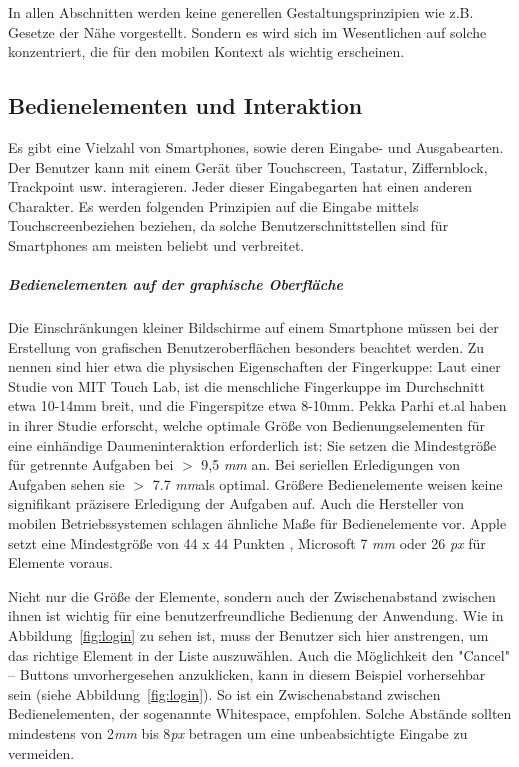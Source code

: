 In allen Abschnitten werden keine generellen Gestaltungsprinzipien wie z.B. Gesetze der Nähe vorgestellt. Sondern es wird sich im Wesentlichen auf solche konzentriert, die für den mobilen Kontext als wichtig erscheinen.

\subsection{Bedienelementen und Interaktion}
\label{sub:Benutzerschnittstellen}

Es gibt eine Vielzahl von Smartphones, sowie deren Eingabe- und Ausgabearten. Der Benutzer kann mit einem Gerät über Touchscreen, Tastatur, Ziffernblock, Trackpoint usw. interagieren. Jeder dieser Eingabegarten hat einen anderen Charakter. Es werden folgenden Prinzipien auf die Eingabe mittels Touchscreenbeziehen beziehen, da solche Benutzerschnittstellen sind für Smartphones am meisten beliebt und verbreitet.

\subparagraph{Bedienelementen auf der graphische Oberfläche} 
\label{subp:gro_ere_interface_elementen}

Die Einschränkungen kleiner Bildschirme auf einem Smartphone müssen bei der Erstellung von grafischen Benutzeroberflächen besonders beachtet werden. Zu nennen sind hier etwa die physischen Eigenschaften der Fingerkuppe: Laut einer Studie von MIT Touch Lab, ist die menschliche Fingerkuppe im Durchschnitt etwa 10-14mm breit, und die Fingerspitze etwa 8-10mm\cite{Srinivasan:2003uu}.  Pekka Parhi  et.al haben in ihrer Studie \cite{Parhi:2006gh} erforscht, welche optimale Größe von Bedienungselementen für eine einhändige Daumeninteraktion erforderlich ist: Sie setzen die Mindestgröße für getrennte Aufgaben bei $>$ 9,5 \textit{mm} an.  Bei seriellen Erledigungen von Aufgaben sehen sie $>$ 7.7 \textit{mm}als optimal. Größere Bedienelemente weisen keine signifikant präzisere Erledigung der Aufgaben auf.
Auch die Hersteller von mobilen Betriebssystemen schlagen ähnliche Maße für Bedienelemente vor. Apple setzt eine Mindestgröße von 44 x 44 Punkten \cite{Apple}, Microsoft 7 \textit{mm} oder 26 \textit{px}\cite{lukeGUI} für Elemente voraus.

Nicht nur die Größe der Elemente, sondern auch der Zwischenabstand zwischen ihnen ist wichtig für eine benutzerfreundliche Bedienung der Anwendung. Wie in Abbildung~\ref{fig:login} zu sehen ist, muss der Benutzer sich hier anstrengen, um das richtige Element in der Liste auszuwählen. Auch die Möglichkeit den "Cancel" – Buttons unvorhergesehen anzuklicken, kann in diesem Beispiel vorhersehbar sein (siehe Abbildung~\ref{fig:login}). So ist ein Zwischenabstand zwischen Bedienelementen, der sogenannte Whitespace,  empfohlen. Solche Abstände sollten mindestens von 2\textit{mm} bis 8\textit{px} betragen\cite{lukeGUI} um eine unbeabsichtigte Eingabe zu vermeiden.

